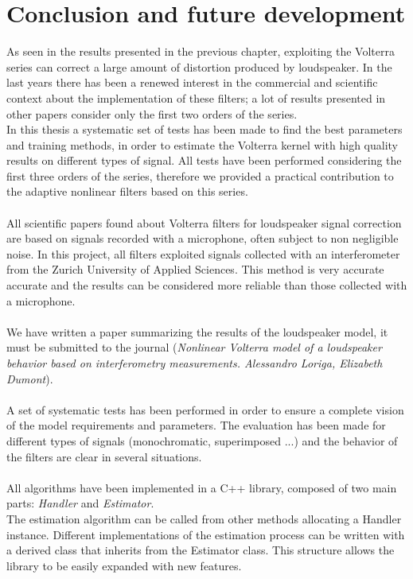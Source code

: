 \chapter{Conclusion and future development}
As seen in the results presented in the previous chapter, exploiting the Volterra series can correct a large amount of distortion produced by loudspeaker. In the last years there has been a renewed interest in the commercial and scientific context about the implementation of these filters; a lot of results presented in other papers consider only the first two orders of the series.\\
In this thesis a systematic set of tests has been made to find the best parameters and training methods, in order to estimate the Volterra kernel with high quality results on different types of signal. All tests have been performed considering the first three orders of the series, therefore we provided a practical contribution to the adaptive nonlinear filters based on this series.\\\\
All scientific papers found about Volterra filters for loudspeaker signal correction are based on signals recorded with a microphone, often subject to non negligible noise. In this project, all filters exploited signals collected with an interferometer from the Zurich University of Applied Sciences. This method is very accurate accurate and the results can be considered more reliable than those collected with a microphone.\\\\
We have written a paper summarizing the results of the loudspeaker model, it must be submitted to the journal (\textit{Nonlinear Volterra model of a loudspeaker behavior based on interferometry measurements. Alessandro Loriga, Elizabeth Dumont}).\\\\
A set of systematic tests has been performed in order to ensure a complete vision of the model requirements and parameters. The evaluation has been made for different types of signals (monochromatic, superimposed ...) and the behavior of the filters are clear in several situations.\\\\
All algorithms have been implemented in a C++ library, composed of two main parts: \textit{Handler} and \textit{Estimator}. \\
The estimation algorithm can be called from other methods allocating a Handler instance. Different implementations of the estimation process can be written with a derived class that inherits from the Estimator class. This structure allows the library to be easily expanded with new features.\\\\
